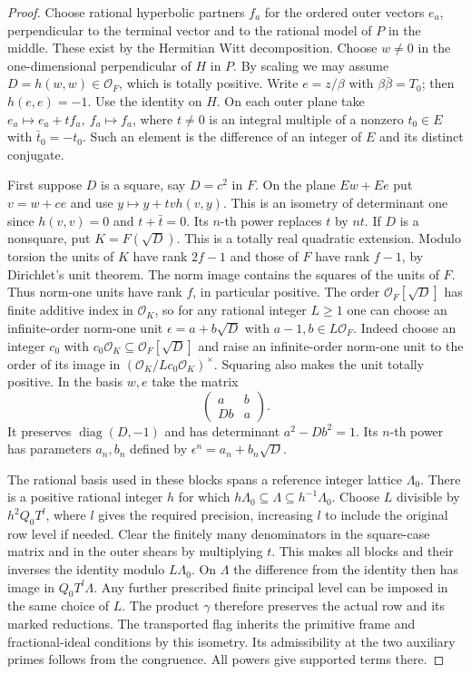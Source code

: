 \documentclass[a4paper,11pt]{article}
\theoremstyle{definition}
\theoremstyle{remark}
\numberwithin{equation}{section}
\begin{document}
\begin{proof}
Choose rational hyperbolic partners \(f_a\) for the ordered
outer vectors \(e_a\), perpendicular to the terminal vector
and to the rational model of \(P\) in the middle. These exist
by the Hermitian Witt decomposition. Choose \(w\ne0\) in the
one-dimensional perpendicular of \(H\) in \(P\). By scaling
we may assume \(D=h(w,w)\in\mathcal O_F\), which is totally
positive. Write \(e=z/\beta\) with \(\beta\bar\beta=T_0\);
then \(h(e,e)=-1\). Use the identity on \(H\). On each outer
plane take \(e_a\mapsto e_a+t f_a,\ f_a\mapsto f_a\), where
\(t\ne0\) is an integral multiple of a nonzero \(t_0\in E\)
with \(\bar t_0=-t_0\). Such an element is the difference of
an integer of \(E\) and its distinct conjugate.

First suppose \(D\) is a square, say \(D=c^2\) in \(F\).
On the plane \(Ew+Ee\) put \(v=w+ce\) and use
\(y\mapsto y+t v h(v,y)\). This is an isometry of determinant
one since \(h(v,v)=0\) and \(t+\bar t=0\). Its \(n\)-th
power replaces \(t\) by \(nt\). If \(D\) is a nonsquare, put
\(K=F(\sqrt D)\). This is a totally real quadratic extension.
Modulo torsion the units of \(K\) have rank \(2f-1\) and
those of \(F\) have rank \(f-1\), by Dirichlet's unit theorem.
The norm image contains the squares of the units of \(F\).
Thus norm-one units have rank \(f\), in particular positive.
The order \(\mathcal O_F[\sqrt D]\) has finite additive index
in \(\mathcal O_K\), so for any rational integer \(L\ge1\)
one can choose an infinite-order norm-one unit
\(\epsilon=a+b\sqrt D\) with \(a-1,b\in L\mathcal O_F\).
Indeed choose an integer \(c_0\) with
\(c_0\mathcal O_K\subseteq\mathcal O_F[\sqrt D]\) and raise
an infinite-order norm-one unit to the order of its image in
\((\mathcal O_K/Lc_0\mathcal O_K)^\times\). Squaring also
makes the unit totally positive. In the basis \(w,e\) take
the matrix
\[
             \begin{pmatrix} a&b\\Db&a\end{pmatrix}.
\]
It preserves \(\operatorname{diag}(D,-1)\) and has determinant
\(a^2-Db^2=1\). Its \(n\)-th power has parameters \(a_n,b_n\)
defined by \(\epsilon^n=a_n+b_n\sqrt D\).

The rational basis used in these blocks spans a reference
integer lattice \(\Lambda_0\). There is a positive rational
integer \(h\) for which
\(h\Lambda_0\subseteq\Lambda\subseteq h^{-1}\Lambda_0\).
Choose \(L\) divisible by \(h^2Q_0T^l\), where \(l\) gives
the required precision, increasing \(l\) to include the original
row level if needed. Clear the finitely many denominators in the
square-case matrix and in the outer shears by multiplying \(t\).
This makes all blocks and their inverses the identity modulo
\(L\Lambda_0\). On \(\Lambda\) the difference from the identity
then has image in \(Q_0T^l\Lambda\). Any further prescribed
finite principal level can be imposed in the same choice of
\(L\). The product \(\gamma\) therefore preserves the actual
row and its marked reductions. The transported flag inherits
the primitive frame and fractional-ideal conditions by this
isometry. Its admissibility at the two auxiliary primes follows
from the congruence. All powers give supported terms there.


\end{proof}
\end{document}
